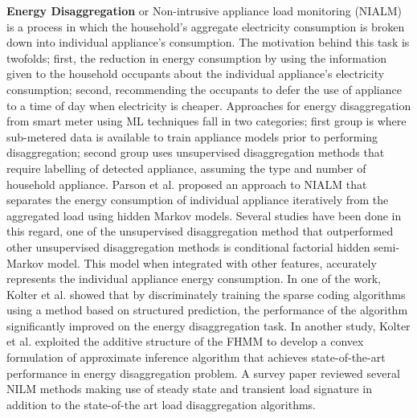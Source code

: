 \documentclass{acm_proc_article-sp}
\begin{document}

\noindent \textbf{Energy Disaggregation} or Non-intrusive appliance load monitoring (NIALM) is a process in which the household's aggregate electricity consumption is broken down into individual appliance's consumption. The motivation behind this task is twofolds; first, the reduction in energy consumption by using the information given to the household occupants about the individual appliance's electricity consumption; second, recommending the occupants to defer the use of appliance to a time of day when electricity is cheaper. Approaches for energy disaggregation from smart meter using ML techniques fall in two categories; first group is where sub-metered data is available to train appliance models prior to performing disaggregation; second group uses unsupervised disaggregation methods that require labelling of detected appliance, assuming the type and number of household appliance.
Parson et al. \cite{eps272990} proposed an approach to NIALM that separates the energy consumption of individual appliance iteratively from the aggregated load using hidden Markov models. Several studies have been done in this regard, one of the unsupervised disaggregation method \cite{DisaggregationHSMM} that outperformed other unsupervised disaggregation methods is conditional factorial hidden semi-Markov model. This model when integrated with other features, accurately represents the individual appliance energy consumption. In one of the work, Kolter et al. \cite{NIPS2010} showed that by discriminately training the sparse coding algorithms using a method based on structured prediction, the performance of the algorithm significantly improved on the energy disaggregation task. In another study, Kolter et al. \cite{KolterJ12} exploited the additive structure of the FHMM to develop a convex formulation of approximate inference algorithm that achieves state-of-the-art performance in energy disaggregation problem. A survey paper \cite{Zoha12articlenon-intrusive} reviewed several NILM methods making use of steady state and transient load signature in addition to the state-of-the art load disaggregation algorithms.
\end{document}
